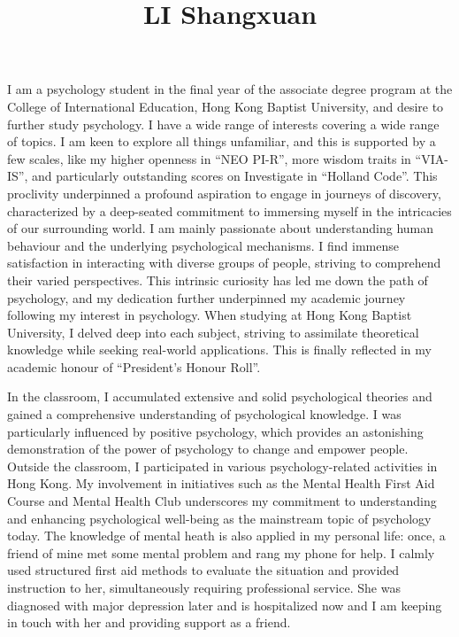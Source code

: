 \documentclass[]{article}
\title{LI Shangxuan}
\date{}
\begin{document}
\maketitle

I am a psychology student in the final year of the associate degree program at the College of International Education, Hong Kong Baptist University, and desire to further study psychology.
I have a wide range of interests covering a wide range of topics. I am keen to explore all things unfamiliar, and this is supported by a few scales, like my higher openness in ``NEO PI-R'', more wisdom traits in ``VIA-IS'', and particularly outstanding scores on Investigate in ``Holland Code''.
This proclivity underpinned a profound aspiration to engage in journeys of discovery, characterized by a deep-seated commitment to immersing myself in the intricacies of our surrounding world.
I am mainly passionate about understanding human behaviour and the underlying psychological mechanisms.
I find immense satisfaction in interacting with diverse groups of people, striving to comprehend their varied perspectives.
This intrinsic curiosity has led me down the path of psychology, and my dedication further underpinned my academic journey following my interest in psychology.
When studying at Hong Kong Baptist University, I delved deep into each subject, striving to assimilate theoretical knowledge while seeking real-world applications.
This is finally reflected in my academic honour of ``President's Honour Roll''.


In the classroom, I accumulated extensive and solid psychological theories and gained a comprehensive understanding of psychological knowledge.
I was particularly influenced by positive psychology, which provides an astonishing demonstration of the power of psychology to change and empower people.
Outside the classroom, I participated in various psychology-related activities in Hong Kong.
My involvement in initiatives such as the Mental Health First Aid Course and Mental Health Club underscores my commitment to understanding and enhancing psychological well-being as the mainstream topic of psychology today.
The knowledge of mental heath is also applied in my personal life: once, a friend of mine met some mental problem and rang my phone for help.
I calmly used structured first aid methods to evaluate the situation and provided instruction to her, simultaneously requiring professional service.
She was diagnosed with major depression later and is hospitalized now and I am keeping in touch with her and providing support as a friend.
\end{document}

